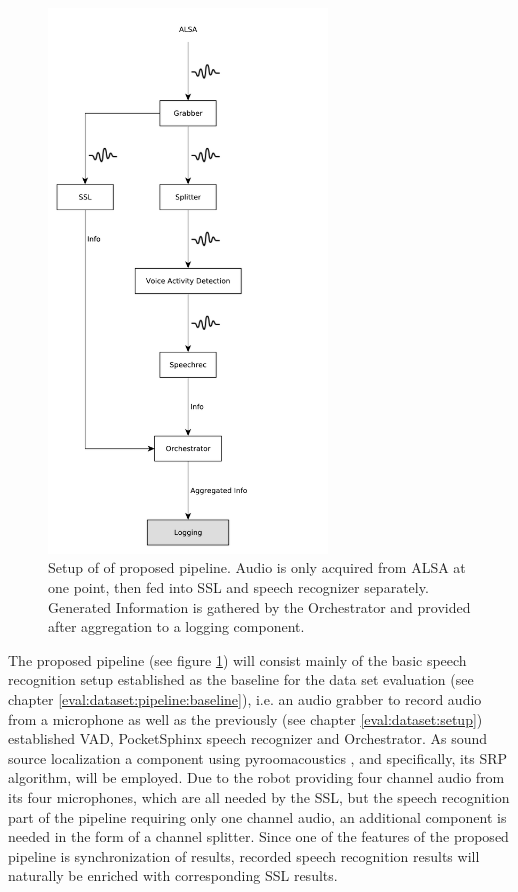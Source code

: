 \begin{figure}[]
	\centering
	\includegraphics[width=0.66\textwidth]{diagrams/eval_task_proposed.pdf}
	\caption{Setup of of proposed pipeline.
		Audio is only acquired from ALSA at one point, then fed into SSL and speech recognizer separately.
		Generated Information is gathered by the Orchestrator and provided after aggregation to a logging component.}
	\label{pic:eval_task_setup_new}
\end{figure}

The proposed pipeline (see figure \ref{pic:eval_task_setup_new}) will consist mainly of the basic speech recognition setup established as the baseline for the data set evaluation (see chapter \ref{eval:dataset:pipeline:baseline}), i.e. an audio grabber to record audio from a microphone as well as the previously (see chapter \ref{eval:dataset:setup}) established VAD, PocketSphinx speech recognizer and Orchestrator.
As sound source localization a component using pyroomacoustics \cite{pyroomacoustics}, and specifically, its SRP algorithm, will be employed.
Due to the robot providing four channel audio from its four microphones, which are all needed by the SSL, but the speech recognition part of the pipeline requiring only one channel audio, an additional component is needed in the form of a channel splitter.
Since one of the features of the proposed pipeline is synchronization of results, recorded speech recognition results will naturally be enriched with corresponding SSL results.

